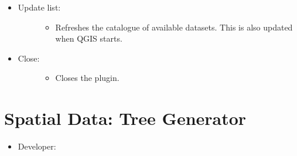 \documentclass[letterpaper,10pt,english]{sphinxmanual}
\begin{document}
\begin{itemize}
\begin{description}
\begin{itemize}
\end{itemize}

\end{description}

\item {} \begin{description}
\item[{Update list:}] \leavevmode\begin{itemize}
\item {} 
Refreshes the catalogue of available datasets. This is also updated when QGIS starts.

\end{itemize}

\end{description}

\item {} \begin{description}
\item[{Close:}] \leavevmode\begin{itemize}
\item {} 
Closes the plugin.

\end{itemize}

\end{description}

\end{itemize}


\section{Spatial Data: Tree Generator}
\label{\detokenize{pre-processor/Spatial Data Tree Generator:spatial-data-tree-generator}}\label{\detokenize{pre-processor/Spatial Data Tree Generator:treegenerator}}\label{\detokenize{pre-processor/Spatial Data Tree Generator::doc}}\begin{itemize}
\item {} 
Developer:

\end{itemize}
\end{document}
